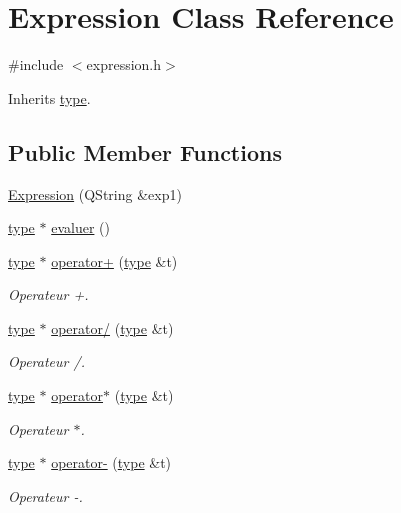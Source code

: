 \hypertarget{class_expression}{\section{Expression Class Reference}
\label{class_expression}
}


{\ttfamily \#include $<$expression.\-h$>$}



Inherits \hyperlink{classtype}{type}.

\subsection*{Public Member Functions}
\begin{DoxyCompactItemize}
\item 
\hyperlink{class_expression_a2dfc0f1fe384a18adb7064f44aca0bed}{Expression} (Q\-String \&exp1)
\item 
\hyperlink{classtype}{type} $\ast$ \hyperlink{class_expression_aef526940109ca420a164455b612243bd}{evaluer} ()
\item 
\hyperlink{classtype}{type} $\ast$ \hyperlink{class_expression_a1572f9f1d8b2619b14d7d58f72a63e22}{operator+} (\hyperlink{classtype}{type} \&t)
\begin{DoxyCompactList}\small\item\em Operateur +. \end{DoxyCompactList}\item 
\hyperlink{classtype}{type} $\ast$ \hyperlink{class_expression_aeb3e786f0524b1b1e2c5b238c8d2e50c}{operator/} (\hyperlink{classtype}{type} \&t)
\begin{DoxyCompactList}\small\item\em Operateur /. \end{DoxyCompactList}\item 
\hyperlink{classtype}{type} $\ast$ \hyperlink{class_expression_a9f63512e41bb2e498951342759a6fa1e}{operator$\ast$} (\hyperlink{classtype}{type} \&t)
\begin{DoxyCompactList}\small\item\em Operateur $\ast$. \end{DoxyCompactList}\item 
\hyperlink{classtype}{type} $\ast$ \hyperlink{class_expression_adb495f245e3652e3605b290d7d41acb5}{operator-\/} (\hyperlink{classtype}{type} \&t)
\begin{DoxyCompactList}\small\item\em Operateur -\/. \end{DoxyCompactList}\item 

\end{DoxyCompactItemize}
